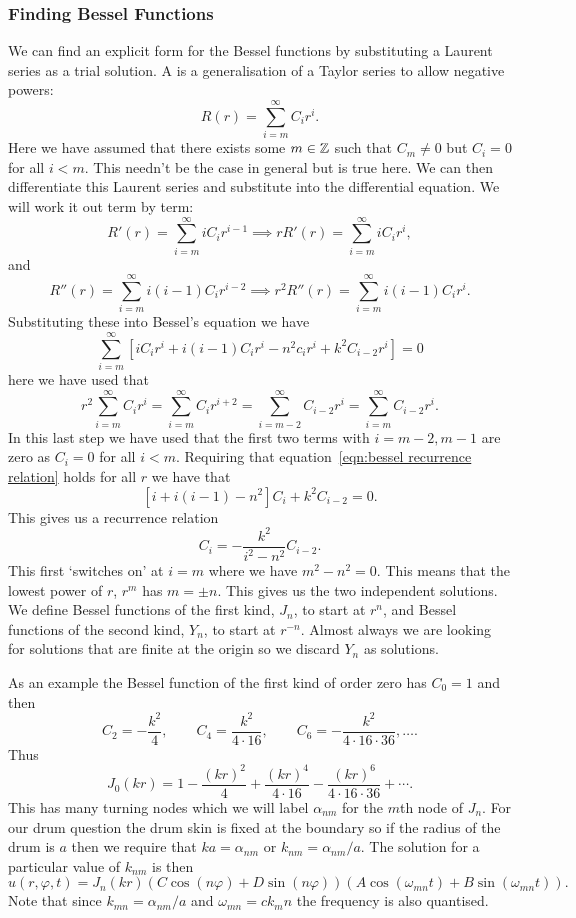 \documentclass[a4paper]{article}
\begin{document}
    \subsubsection{Finding Bessel Functions}
    We can find an explicit form for the Bessel functions by substituting a Laurent series as a trial solution.
    A  is a generalisation of a Taylor series to allow negative powers:
    \[R(r) = \sum_{i = m}^{\infty}C_ir^i.\]
    Here we have assumed that there exists some \(m\in\mathbb{Z}\) such that \(C_m \ne 0\) but \(C_i = 0\) for all \(i < m\).
    This needn't be the case in general but is true here.
    We can then differentiate this Laurent series and substitute into the differential equation.
    We will work it out term by term:
    \[R'(r) = \sum_{i=m}^{\infty}iC_ir^{i - 1} \implies rR'(r) = \sum_{i=m}^{\infty} iC_ir^i,\]
    and
    \[R''(r) = \sum_{i=m}^{\infty}i(i - 1)C_ir^{i - 2} \implies r^2R''(r) = \sum_{i=m}^{\infty} i(i - 1)C_ir^i.\]
    Substituting these into Bessel's equation we have
    \begin{equation}\label{eqn:bessel recurrence relation}
        \sum_{i=m}^{\infty} \left[iC_ir^i + i(i - 1)C_ir^i - n^2c_ir^i + k^2C_{i-2}r^i\right] = 0
    \end{equation}
    here we have used that
    \[r^2\sum_{i=m}^{\infty}C_ir^i = \sum_{i=m}^{\infty} C_ir^{i+2} = \sum_{i=m-2}^{\infty} C_{i-2}r^i = \sum_{i=m}^{\infty} C_{i-2}r^i.\]
    In this last step we have used that the first two terms with \(i = m-2, m-1\) are zero as \(C_i = 0\) for all \(i < m\).
    Requiring that equation~\ref{eqn:bessel recurrence relation} holds for all \(r\) we have that
    \[[i + i(i - 1) - n^2]C_i + k^2C_{i-2} = 0.\]
    This gives us a recurrence relation
    \[C_{i} = -\frac{k^2}{i^2 - n^2}C_{i-2}.\]
    This first `switches on' at \(i = m\) where we have \(m^2 - n^2 = 0\).
    This means that the lowest power of \(r\), \(r^m\) has \(m = \pm n\).
    This gives us the two independent solutions.
    We define Bessel functions of the first kind, \(J_n\), to start at \(r^n\), and Bessel functions of the second kind, \(Y_n\), to start at \(r^{-n}\).
    Almost always we are looking for solutions that are finite at the origin so we discard \(Y_n\) as solutions.
    
    As an example the Bessel function of the first kind of order zero has \(C_0 = 1\) and then
    \[C_2 = -\frac{k^2}{4}, \qquad C_4 = \frac{k^2}{4\cdot 16}, \qquad C_6 = -\frac{k^2}{4\cdot 16\cdot 36}, \dotsc.\]
    Thus
    \[J_0(kr) = 1 - \frac{(kr)^2}{4} + \frac{(kr)^4}{4\cdot 16} - \frac{(kr)^6}{4\cdot 16\cdot 36} + \dotsb.\]
    This has many turning nodes which we will label \(\alpha_{nm}\) for the \(m\)th node of \(J_n\).
    For our drum question the drum skin is fixed at the boundary so if the radius of the drum is \(a\) then we require that \(ka = \alpha_{nm}\) or \(k_{nm} = \alpha_{nm}/a\).
    The solution for a particular value of \(k_{nm}\) is then
    \[u(r, \varphi, t) = J_n(kr)(C\cos(n\varphi) + D\sin(n\varphi))(A\cos(\omega_{mn} t) + B\sin(\omega_{mn}t)).\]
    Note that since \(k_{mn} = \alpha_{nm}/a\) and \(\omega_{mn} = ck_mn\) the frequency is also quantised.
    
\end{document}
